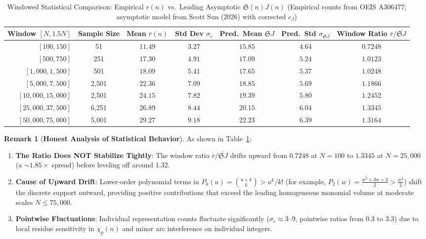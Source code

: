 \documentclass[11pt, a4paper]{article}
\theoremstyle{plain}
\theoremstyle{definition}
\newtheorem{remark}[theorem]{Remark}
\begin{document}
\begin{table}[htbp]
\centering
\caption{Windowed Statistical Comparison: Empirical $r(n)$ vs.\ Leading Asymptotic $\mathfrak{S}(n) J(n)$ (Empirical counts from OEIS A306477; asymptotic model from Scott Sun (2026) with corrected $c_J$)}
\label{tab:windowed}
\begin{tabular}{@{}rcccccc@{}}
\toprule
Window $[N, 1.5N]$ & Sample Size & Mean $\bar{r}(n)$ & Std Dev $\sigma_r$ & Pred.\ Mean $\overline{\mathfrak{S}J}$ & Pred.\ Std $\sigma_{\mathfrak{S}J}$ & Window Ratio $\bar{r}/\overline{\mathfrak{S}J}$ \\
\midrule
$[100, 150]$ & 51 & $11.49$ & $3.27$ & $15.85$ & $4.64$ & $0.7248$ \\
$[500, 750]$ & 251 & $17.30$ & $4.91$ & $17.09$ & $5.24$ & $1.0123$ \\
$[1{,}000, 1{,}500]$ & 501 & $18.09$ & $5.41$ & $17.65$ & $5.37$ & $1.0248$ \\
$[5{,}000, 7{,}500]$ & 2{,}501 & $22.36$ & $7.09$ & $18.85$ & $5.69$ & $1.1866$ \\
$[10{,}000, 15{,}000]$ & 2{,}501 & $24.15$ & $7.82$ & $19.39$ & $5.80$ & $1.2452$ \\
$[25{,}000, 37{,}500]$ & 6{,}251 & $26.89$ & $8.44$ & $20.15$ & $6.04$ & $1.3345$ \\
$[50{,}000, 75{,}000]$ & 5{,}001 & $29.27$ & $9.18$ & $22.23$ & $6.39$ & $1.3164$ \\
\bottomrule
\end{tabular}
\end{table}

\begin{remark}[\textbf{Honest Analysis of Statistical Behavior}]
As shown in Table~\ref{tab:windowed}:
\begin{enumerate}
\item \textbf{The Ratio Does NOT Stabilize Tightly}: The window ratio $\bar{r}/\overline{\mathfrak{S}J}$ drifts upward from $0.7248$ at $N=100$ to $1.3345$ at $N=25{,}000$ (a $\sim 1.85\times$ spread) before leveling off around $1.32$.
\item \textbf{Cause of Upward Drift}: Lower-order polynomial terms in $P_k(u) = \binom{u+k}{k} > u^k/k!$ (for example, $P_2(w) = \frac{w^2+3w+2}{2} > \frac{w^2}{2}$) shift the discrete support outward, providing positive contributions that exceed the leading homogeneous monomial volume at moderate scales $N \le 75{,}000$.
\item \textbf{Pointwise Fluctuations}: Individual representation counts fluctuate significantly ($\sigma_r \approx 3$--$9$, pointwise ratios from $0.3$ to $3.3$) due to local residue sensitivity in $\chi_p(n)$ and minor arc interference on individual integers.
\end{enumerate}
\end{remark}
\end{document}
